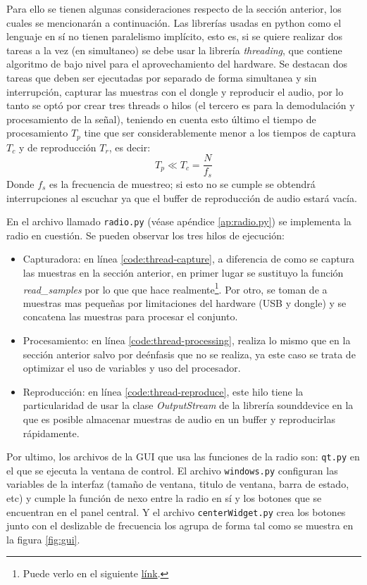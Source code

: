 Para ello se tienen algunas consideraciones respecto de la sección anterior, los cuales se mencionarán a continuación.
Las librerías usadas en python como el lenguaje en sí no tienen paralelismo implícito, esto es, si se quiere realizar dos tareas a la vez (en simultaneo) se debe usar la librería \emph{threading}, que contiene algoritmo de bajo nivel para el aprovechamiento del hardware.
Se destacan dos tareas que deben ser ejecutadas por separado de forma simultanea y sin interrupción, capturar las muestras con el dongle y reproducir el audio, por lo tanto se optó por crear tres threads o hilos (el tercero es para la demodulación y procesamiento de la señal), teniendo en cuenta esto último el tiempo de procesamiento $T_p$ tine que ser considerablemente menor a los tiempos de captura $T_c$ y de reproducción $T_r$, es decir:
$$
	T_p \ll T_c = \frac{N}{f_s}
$$
Donde $f_s$ es la frecuencia de muestreo; si esto no se cumple se obtendrá interrupciones al escuchar ya que el buffer de reproducción de audio estará vacía.

En el archivo llamado \texttt{radio.py} (véase apéndice \ref{ap:radio.py}) se implementa la radio en cuestión. Se pueden observar los tres hilos de ejecución: 
\begin{itemize}
	\item Capturadora: en línea \ref{code:thread-capture}, a diferencia de como se captura las muestras en la sección anterior, en primer lugar se sustituyo la función \emph{read\_samples} por lo que que hace realmente\footnote{Puede verlo en el siguiente \href{https://github.com/roger-/pyrtlsdr/blob/master/rtlsdr/rtlsdr.py\#L480}{línk}.}.
	Por otro, se toman de a muestras mas pequeñas por limitaciones del hardware (USB y dongle) y se concatena las muestras para procesar el conjunto. 
	
	\item Procesamiento: en línea \ref{code:thread-processing}, realiza lo mismo que en la sección anterior salvo por deénfasis que no se realiza, ya este caso se trata de optimizar el uso de variables y uso del procesador.

	\item Reproducción: en línea \ref{code:thread-reproduce}, este hilo tiene la particularidad de usar la clase \emph{OutputStream} de la librería sounddevice en la que es posible almacenar muestras de audio en un buffer y reproducirlas rápidamente.
\end{itemize}

Por ultimo, los archivos de la GUI que usa las funciones de la radio son: \texttt{qt.py} en el que se ejecuta la ventana de control. El archivo \texttt{windows.py} configuran las variables de la interfaz (tamaño de ventana, titulo de ventana, barra de estado, etc) y cumple la función de nexo entre la radio en sí y los botones que se encuentran en el panel central. Y el archivo \texttt{centerWidget.py} crea los botones junto con el deslizable de frecuencia los agrupa de forma tal como se muestra en la figura \ref{fig:gui}.

